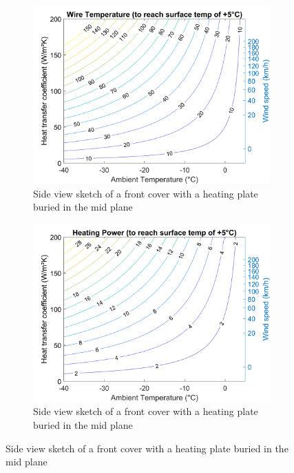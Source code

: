 \begin{figure}[ht]
\centering
\begin{minipage}[b]{0.48\linewidth}
\begin{figure} [H]
	\centering
	\includegraphics[scale=0.55]{Pictures/B1Makrolon_Tsurf5_WireTemp.png}
	\caption[Front Cover Heat Transfer Model]{Side view sketch of a front cover with a heating plate buried in the mid plane }
	\label{fig:fig1}
\end{figure}

\label{fig:minipage1}
\end{minipage}
\quad
\begin{minipage}[b]{0.48\linewidth}
\begin{figure} [H]
	\centering
	\includegraphics[scale=0.55]{Pictures/B1Makrolon_Tsurf5_Power.png}
	\caption[Front Cover Heat Transfer Model]{Side view sketch of a front cover with a heating plate buried in the mid plane}
	\label{fig:fig1}
\end{figure}
\label{fig:minipage2}
\end{minipage}
\end{figure}

